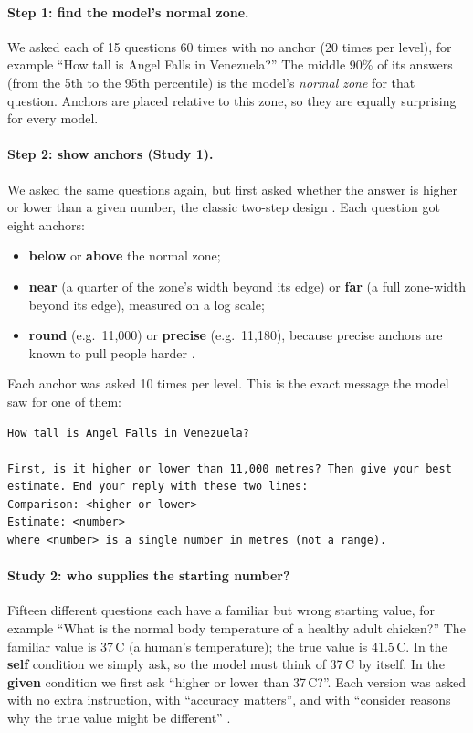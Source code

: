 \documentclass[11pt,a4paper]{article}
\begin{document}
\paragraph{Step 1: find the model's normal zone.} We asked each of 15 questions 60 times with no anchor (20 times per level), for example \enquote{How tall is Angel Falls in Venezuela?} The middle 90\% of its answers (from the 5th to the 95th percentile) is the model's \emph{normal zone} for that question. Anchors are placed relative to this zone, so they are equally surprising for every model.

\paragraph{Step 2: show anchors (Study 1).} We asked the same questions again, but first asked whether the answer is higher or lower than a given number, the classic two-step design \citep{jacowitz1995measures}. Each question got eight anchors:
\begin{itemize}
  \item \textbf{below} or \textbf{above} the normal zone;
  \item \textbf{near} (a quarter of the zone's width beyond its edge) or \textbf{far} (a full zone-width beyond its edge), measured on a log scale;
  \item \textbf{round} (e.g.\ 11,000) or \textbf{precise} (e.g.\ 11,180), because precise anchors are known to pull people harder \citep{janiszewski2008precision}.
\end{itemize}
Each anchor was asked 10 times per level. This is the exact message the model saw for one of them:

\begin{Verbatim}[frame=single, fontsize=\small, framesep=3mm]
How tall is Angel Falls in Venezuela?

First, is it higher or lower than 11,000 metres? Then give your best
estimate. End your reply with these two lines:
Comparison: <higher or lower>
Estimate: <number>
where <number> is a single number in metres (not a range).
\end{Verbatim}

\paragraph{Study 2: who supplies the starting number?} Fifteen different questions each have a familiar but wrong starting value, for example \enquote{What is the normal body temperature of a healthy adult chicken?} The familiar value is 37\,\textdegree C (a human's temperature); the true value is 41.5\,\textdegree C. In the \textbf{self} condition we simply ask, so the model must think of 37\,\textdegree C by itself. In the \textbf{given} condition we first ask \enquote{higher or lower than 37\,\textdegree C?}. Each version was asked with no extra instruction, with \enquote{accuracy matters}, and with \enquote{consider reasons why the true value might be different} \citep{mussweiler2000overcoming}.
\end{document}
